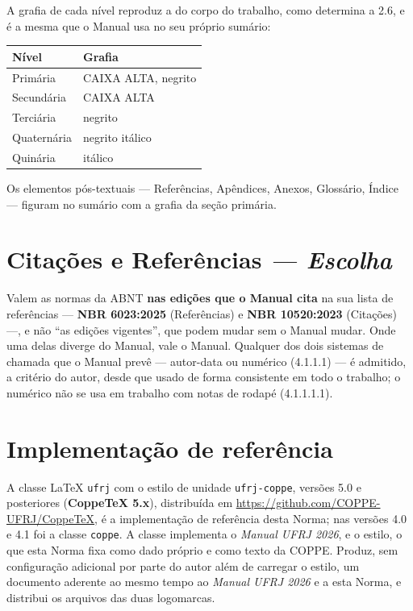 \documentclass[a4paper,11pt]{article}
\newcommand\tipo[1]{\normalfont\textit{--- #1}}
\begin{document}
A grafia de cada nível reproduz a do corpo do trabalho, como determina a 2.6, e
é a mesma que o Manual usa no seu próprio sumário:

\begin{center}
\begin{tabular}{@{}ll@{}}
\toprule
\textbf{Nível} & \textbf{Grafia}\\
\midrule
Primária    & CAIXA ALTA, negrito\\
Secundária  & CAIXA ALTA\\
Terciária   & negrito\\
Quaternária & negrito itálico\\
Quinária    & itálico\\
\bottomrule
\end{tabular}
\end{center}

Os elementos pós-textuais --- Referências, Apêndices, Anexos, Glossário,
Índice --- figuram no sumário com a grafia da seção primária.

\section{Citações e Referências \tipo{Escolha}}
\label{norma:citacoes}

Valem as normas da ABNT \textbf{nas edições que o Manual cita} na sua lista de
referências --- \textbf{NBR 6023:2025} (Referências) e \textbf{NBR 10520:2023}
(Citações) ---, e não ``as edições vigentes'', que podem mudar sem o Manual
mudar. Onde uma delas diverge do Manual, vale o Manual. Qualquer dos dois
sistemas de chamada que o Manual prevê --- autor-data ou numérico (4.1.1.1) ---
é admitido, a critério do autor, desde que usado de forma consistente em todo o
trabalho; o numérico não se usa em trabalho com notas de rodapé (4.1.1.1.1).

\hrulefill

\section{Implementação de referência}
\label{norma:implementacao}

A classe LaTeX \texttt{ufrj} com o estilo de unidade \texttt{ufrj-coppe},
versões 5.0 e posteriores (\textbf{CoppeTeX 5.x}), distribuída em
\url{https://github.com/COPPE-UFRJ/CoppeTeX}, é a implementação de referência
desta Norma; nas versões 4.0 e 4.1 foi a classe \texttt{coppe}. A classe
implementa o \textit{Manual UFRJ 2026}, e o estilo, o que esta Norma fixa como
dado próprio e como texto da COPPE. Produz, sem configuração adicional por parte
do autor além de carregar o estilo, um documento aderente ao mesmo tempo ao
\textit{Manual UFRJ 2026} e a esta Norma, e distribui os arquivos das duas
logomarcas.
\end{document}
